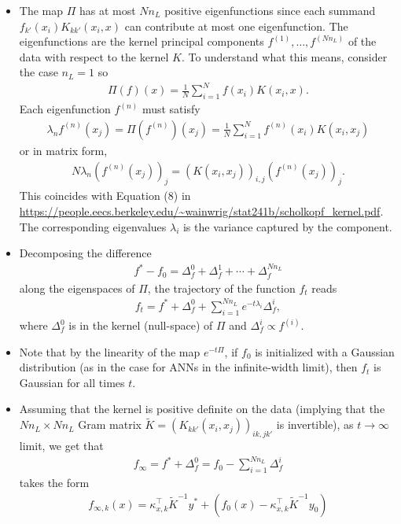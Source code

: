 \documentclass[10pt]{article}
\newcommand{\paran}[1]{{( #1 )}}
\begin{document}
\begin{itemize}
\item The map $\Pi$ has at most $Nn_L$ positive eigenfunctions since each summand $f_{k'}(x_i)K_{kk'}(x_i,x)$ can contribute at most one eigenfunction. The eigenfunctions are the kernel principal components $f^\paran{1}, \ldots, f^\paran{Nn_L}$ of the data with respect to the kernel $K$. To understand what this means, consider the case $n_L = 1$ so
\begin{align*}
\Pi(f)(x) = \frac{1}{N} \sum_{i = 1}^N f(x_i) K(x_i,x).
\end{align*}
Each eigenfunction $f^\paran{n}$ must satisfy
\begin{align*}
\lambda_n f^\paran{n}(x_j) = \Pi(f^\paran{n})(x_j) = \frac{1}{N} \sum_{i = 1}^N f^\paran{n}(x_i) K(x_i,x_j)
\end{align*}
or in matrix form,
\begin{align*}
N \lambda_n (f^\paran{n}(x_j))_j = (K(x_i,x_j))_{i,j} (f^\paran{n}(x_j))_j.
\end{align*}
This coincides with Equation (8) in \url{https://people.eecs.berkeley.edu/~wainwrig/stat241b/scholkopf_kernel.pdf}. The corresponding eigenvalues $\lambda_i$ is the variance captured by the component.
\item Decomposing the difference
\begin{align*}
f^* - f_0 = \Delta^0_f + \Delta^1_f + \cdots + \Delta^{Nn_L}_f
\end{align*}
along the eigenspaces of $\Pi$, the trajectory of the function $f_t$ reads
\begin{align*}
f_t = f^* + \Delta^0_f + \sum_{i = 1}^{Nn_L} e^{-t \lambda_i} \Delta^i_f,
\end{align*}
where $\Delta^0_f$ is in the kernel (null-space) of $\Pi$ and $\Delta^i_f \propto f^\paran{i}$.
\item Note that by the linearity of the map $e^{-t\Pi}$, if $f_0$ is initialized with a Gaussian distribution (as in the case for ANNs in the infinite-width limit), then $f_t$ is Gaussian for all times $t$.
\item Assuming that the kernel is positive definite on the data (implying that the $Nn_L \times Nn_L$ Gram matrix $\tilde{K} = (K_{kk'}(x_i,x_j))_{ik,jk'}$ is invertible), as $t \rightarrow \infty$ limit, we get that
\begin{align*}
f_\infty = f^* + \Delta^0_f = f_0 - \sum_{i = 1}^{Nn_L} \Delta^i_f
\end{align*}
takes the form
\begin{align*}
f_{\infty,k}(x) = \kappa^\top_{x,k} \tilde{K}^{-1} y^* + (f_0(x) - \kappa^\top_{x,k} \tilde{K}^{-1} y_0)

\end{align*}
\end{itemize}
\end{document}
